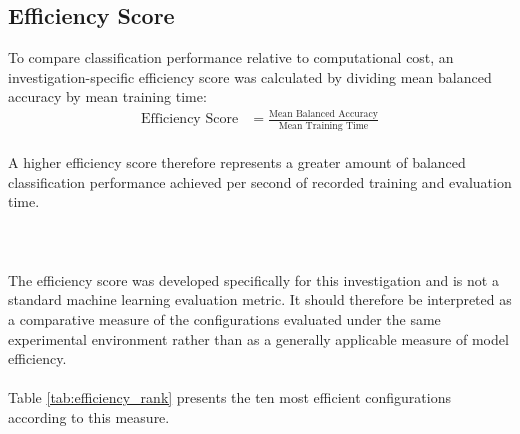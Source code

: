 \documentclass[12pt, a4paper]{report}
\let\oldsubsection\subsection
\renewcommand{\subsection}{%
    \Needspace{6\baselineskip}%
    \oldsubsection
}
\begin{document}
			\subsection{Efficiency Score}
				
				To compare classification performance relative to computational cost, an \\investigation-specific efficiency score was calculated by dividing mean balanced accuracy by mean training time:\\
				\begin{align*}
					\text{Efficiency Score}&=\frac{\text{Mean Balanced Accuracy}}{\text{Mean Training Time}}
				\end{align*}\\
				A higher efficiency score therefore represents a greater amount of balanced classification performance achieved per second of recorded training and evaluation time.\\\\\\\\
				The efficiency score was developed specifically for this investigation and is not a standard machine learning evaluation metric. It should therefore be interpreted as a comparative measure of the configurations evaluated under the same experimental environment rather than as a generally applicable measure of model efficiency.\\\\
				Table \ref{tab:efficiency_rank} presents the ten most efficient configurations according to this measure.\\
				\setlength{\tabcolsep}{3pt}
\end{document}
